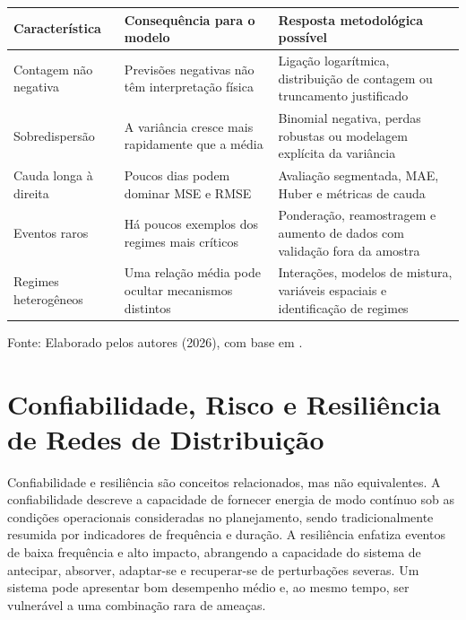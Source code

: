 \begin{quadro}[H]
\caption{Implicações estatísticas da natureza das interrupções}
\label{qua:implicacoes_contagem}
\centering
\small
\begin{tabular}{p{3.5cm} p{5.0cm} p{5.0cm}}
\toprule
\textbf{Característica} & \textbf{Consequência para o modelo} & \textbf{Resposta metodológica possível} \\
\midrule
Contagem não negativa & Previsões negativas não têm interpretação física & Ligação logarítmica, distribuição de contagem ou truncamento justificado \\
Sobredispersão & A variância cresce mais rapidamente que a média & Binomial negativa, perdas robustas ou modelagem explícita da variância \\
Cauda longa à direita & Poucos dias podem dominar MSE e RMSE & Avaliação segmentada, MAE, Huber e métricas de cauda \\
Eventos raros & Há poucos exemplos dos regimes mais críticos & Ponderação, reamostragem e aumento de dados com validação fora da amostra \\
Regimes heterogêneos & Uma relação média pode ocultar mecanismos distintos & Interações, modelos de mistura, variáveis espaciais e identificação de regimes \\
\bottomrule
\end{tabular}
\normalsize
\par\smallskip
{\small Fonte: Elaborado pelos autores (2026), com base em \cite{arora2023probabilistic, zhao2024variational, rastgoo2025extreme}.\par}
\end{quadro}

\section{Confiabilidade, Risco e Resiliência de Redes de Distribuição}\label{sec:risco_resiliencia}

Confiabilidade e resiliência são conceitos relacionados, mas não equivalentes. A confiabilidade descreve a capacidade de fornecer energia de modo contínuo sob as condições operacionais consideradas no planejamento, sendo tradicionalmente resumida por indicadores de frequência e duração. A resiliência enfatiza eventos de baixa frequência e alto impacto, abrangendo a capacidade do sistema de antecipar, absorver, adaptar-se e recuperar-se de perturbações severas. Um sistema pode apresentar bom desempenho médio e, ao mesmo tempo, ser vulnerável a uma combinação rara de ameaças.

